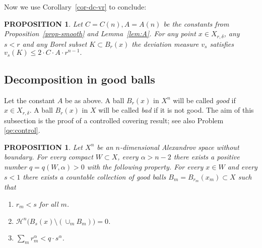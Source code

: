 \documentclass[12pt,leqno,intlimits]{amsart}
\numberwithin{equation}{section}
\newtheorem{prop}[thm]{PROPOSITION}
\theoremstyle{definition}
\theoremstyle{remark}
\newcommand{\cref}[1]{Corollary~\ref{#1}}
\newcommand{\pref}[1]{Proposition~\ref{#1}}
\newcommand{\lref}[1]{Lemma~\ref{#1}}
\def\RR{\mathbb R}
\def\eps{\varepsilon}
\begin{document}

Now we use \cref{cor-dc-vr} to conclude:

\begin{prop} \label{ballmeasure}
Let $C=C(n),A=A(n)$ be the constants from \pref{prop-smooth} and \lref{lem:A}.
For any point $x\in X_{r,\delta}$, any $s<r$ and any
Borel subset $K\subset B_r (x)$ the deviation measure $v_s $ satisfies
$v_s (K) \leq 2\cdot C\cdot A \cdot r^{n-1}.$
\end{prop}

\subsection{Decomposition in good balls}
Let the constant $A$ be as above.
A ball $B_r(x)$ in $X^n$ will be called \emph{good} if $x\in X_{r,\delta}$.
%
A ball $B_r(x)$ in $X$ will be called \emph{bad} if it is not good.
The aim of this subsection is the proof of a controlled covering result; see also Problem \ref{qe:control}.

\begin{prop}\label{prop:covering}
Let $X^n$ be an $n$-dimensional Alexandrov space without boundary.
For every compact $W\subset X$, every $\alpha >n-2$ there exists
a positive number $ q =q(W,\alpha ) >0$ with the following property. For every $x\in W$ and every $s<1 $
there exists a countable collection of good balls $B_m=B_{r_m}(x_m) \subset X$
such that
\begin{enumerate}
\item $r_m<s$ for all $m$.
\item $ \mathcal H^n \big(B_s (x) \setminus (\cup _m B_m )\big)=0$.
\item $\sum_m r_m^{\alpha}< q \cdot s^{\alpha}$.
\end{enumerate}
\end{prop}
\end{document}

